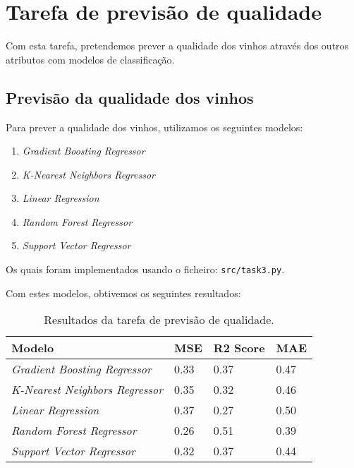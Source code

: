 \documentclass{article}
\begin{document}
    \section{Tarefa de previsão de qualidade}

    Com esta tarefa, pretendemos prever a qualidade dos vinhos através dos outros atributos com modelos de classificação.

    \subsection{Previsão da qualidade dos vinhos}

    Para prever a qualidade dos vinhos, utilizamos os seguintes modelos:

    \begin{enumerate}
        \item \textit{Gradient Boosting Regressor}
        \item \textit{K-Nearest Neighbors Regressor}
        \item \textit{Linear Regression}
        \item \textit{Random Forest Regressor}
        \item \textit{Support Vector Regressor}
    \end{enumerate}

    Os quais foram implementados usando o ficheiro: \texttt{src/task3.py}.

    Com estes modelos, obtivemos os seguintes resultados:

    \begin{table}[ht]
        \centering
        \begin{tabular}{@{}llll@{}}
            \toprule
            Modelo                                 & MSE  & R2 Score & MAE  \\ \midrule
            \textit{Gradient Boosting Regressor}   & 0.33 & 0.37     & 0.47 \\
            \textit{K-Nearest Neighbors Regressor} & 0.35 & 0.32     & 0.46 \\
            \textit{Linear Regression}             & 0.37 & 0.27     & 0.50 \\
            \textit{Random Forest Regressor}       & 0.26 & 0.51     & 0.39 \\
            \textit{Support Vector Regressor}      & 0.32 & 0.37     & 0.44 \\ \bottomrule
        \end{tabular}
        \caption{Resultados da tarefa de previsão de qualidade.}
        \label{tab:task3_results}
    \end{table}
\end{document}
